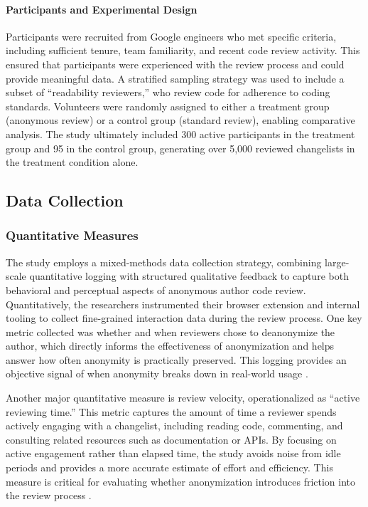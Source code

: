 \paragraph{Participants and Experimental Design}
Participants were recruited from Google engineers who met specific criteria, including sufficient tenure, team familiarity, and recent code review activity. This ensured that participants were experienced with the review process and could provide meaningful data. A stratified sampling strategy was used to include a subset of “readability reviewers,” who review code for adherence to coding standards. Volunteers were randomly assigned to either a treatment group (anonymous review) or a control group (standard review), enabling comparative analysis. The study ultimately included 300 active participants in the treatment group and 95 in the control group, generating over 5,000 reviewed changelists in the treatment condition alone.

\subsection{Data Collection}
\subsubsection{Quantitative Measures}
The study employs a mixed-methods data collection strategy, combining large-scale quantitative logging with structured qualitative feedback to capture both behavioral and perceptual aspects of anonymous author code review. Quantitatively, the researchers instrumented their browser extension and internal tooling to collect fine-grained interaction data during the review process. One key metric collected was whether and when reviewers chose to deanonymize the author, which directly informs the effectiveness of anonymization and helps answer how often anonymity is practically preserved. This logging provides an objective signal of when anonymity breaks down in real-world usage .

Another major quantitative measure is review velocity, operationalized as “active reviewing time.” This metric captures the amount of time a reviewer spends actively engaging with a changelist, including reading code, commenting, and consulting related resources such as documentation or APIs. By focusing on active engagement rather than elapsed time, the study avoids noise from idle periods and provides a more accurate estimate of effort and efficiency. This measure is critical for evaluating whether anonymization introduces friction into the review process .


